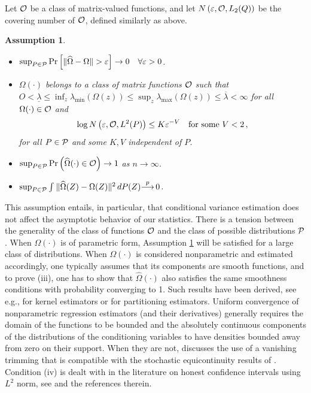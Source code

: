 \documentclass[12pt]{article}
\newcommand{\1}{\mathbf{1}}
\newtheorem{hp}{Assumption}
\newcommand{\cvp}{\mbox{$\stackrel{p}{\longrightarrow}\,$}}
\begin{document}
Let ${\cal O}$ be a class of matrix-valued functions, and let $N \left(
\varepsilon,{\cal O}, L_{2} (Q)\right)$ be the covering number of
${\cal O}$, defined similarly as above.
\begin{hp}
\label{ass:variance}
\begin{itemize}
\item[(i)] $\sup_{P \in {\cal P}} \Pr \left[ \| \widehat{\Omega} - \Omega\| > \varepsilon
\right] \rightarrow 0 \quad  \forall \varepsilon >0$.
\item[(ii)] $\Omega (\cdot)$ belongs
to a class of matrix functions  ${\cal O}$  such that
$O < \underline{\lambda} \leq \inf_{z} \lambda_{\min} (\Omega (z)) \leq
\sup_{z} \lambda_{\max} (\Omega (z)) \leq \overline{\lambda} < \infty$
for all $\Omega(\cdot)\in {\cal O}$ and
\[
\log N \left( \varepsilon, {\cal O}, L^{2} (P) \right) \leq K
\varepsilon^{-V} \quad \mbox{for some } V < 2 \, ,
\]
for all $P \in {\cal P}$ and  some $K,V$  independent of $P$.
\item[(iii)] $\sup_{P\in {\cal P}}
\Pr \left( \widehat{\Omega}(\cdot) \in {\cal O}\right) \rightarrow 1$
as  $n\rightarrow\infty$.
\item[(iv)] $ \sup_{P \in {\cal P}}  \int_{}^{}{} \| \widehat{\Omega} (Z) - \Omega (Z)
\|^{2} \, dP (Z) \cvp 0$.
\end{itemize}
\end{hp}
This assumption entails, in particular, that conditional variance
estimation does not affect the asymptotic behavior of our statistics.
There is a tension between the generality of the class of functions
${\cal O}$ and the class of possible distributions ${\cal P}$.
When $\Omega (\cdot)$ is of parametric form, Assumption
\ref{ass:variance} will be satisfied for a large class of
distributions.  When $\Omega(\cdot)$ is considered nonparametric and
estimated accordingly, one typically assumes that its components are
smooth functions, and to prove (iii), one has to show that $\widehat{\Omega}(\cdot)$
also satisfies the same smoothness conditions with probability
converging to 1.  Such results have been derived, see
e.g., \cite{andrews_nonparametric_1995} for kernel estimators or
\cite{cattaneo_optimal_2013} for partitioning estimators.  Uniform
convergence of nonparametric regression estimators (and their
derivatives) generally requires the domain of the functions to be
bounded and the absolutely continuous components of the distributions
of the conditioning variables to have densities bounded away from zero
on their support. When they are not, \cite{andrews_nonparametric_1995}
discusses the use of a vanishing trimming that is compatible with the
stochastic equicontinuity results of \cite{AndrewsHB}. Condition (iv)
is dealt with in the literature on honest confidence intervals using
$L^{2}$ norm, see \cite{robins_adaptive_2006} and the references therein.
\end{document}
